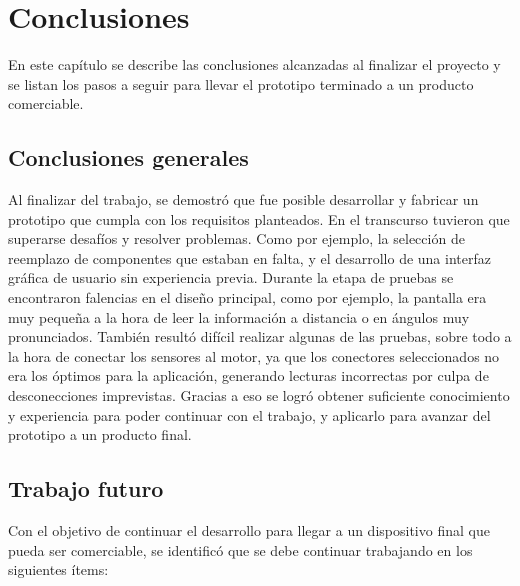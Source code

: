 \chapter{Conclusiones}

\label{Chapter5}

En este capítulo se describe las conclusiones alcanzadas al finalizar el proyecto y se listan los pasos a seguir para llevar el prototipo terminado a un producto comerciable.

\section{Conclusiones generales}

Al finalizar del trabajo, se demostró que fue posible desarrollar y fabricar un prototipo que cumpla con los requisitos planteados. En el transcurso tuvieron que superarse desafíos y resolver problemas. Como por ejemplo, la selección de reemplazo de componentes que estaban en falta, y el desarrollo de una interfaz gráfica de usuario sin experiencia previa.  Durante la etapa de pruebas se encontraron falencias en el diseño principal, como por ejemplo, la pantalla era muy pequeña a la hora de leer la información a distancia o en ángulos muy pronunciados. También resultó difícil realizar algunas de las pruebas, sobre todo a la hora de conectar los sensores al motor, ya que los conectores seleccionados no era los óptimos para la aplicación, generando lecturas incorrectas por culpa de desconecciones imprevistas. Gracias a eso se logró obtener suficiente conocimiento y experiencia para poder continuar con el trabajo, y aplicarlo para avanzar del prototipo a un producto final.

\section{Trabajo futuro}
Con el objetivo de continuar el desarrollo para llegar a un dispositivo final que pueda ser comerciable, se identificó que se debe continuar trabajando en los siguientes ítems:

